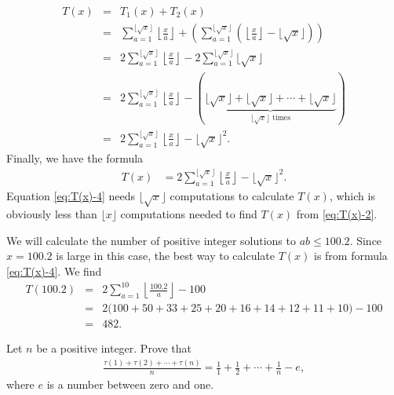 \documentclass[12pt]{subfile}
\begin{document}
	\begin{eqnarray*}
		T(x) &=&  T_1(x) + T_2(x)\\
			 &=& \sum_{a=1}^{\lfloor\sqrt x\rfloor} \left\lfloor\frac{x}{a}\right\rfloor + \left(\sum_{a=1}^{\lfloor\sqrt x\rfloor} \left(\left\lfloor\frac{x}{a}\right\rfloor - \lfloor \sqrt x \rfloor\right)\right)\\
			 &=& 2\sum_{a=1}^{\lfloor\sqrt x\rfloor} \left\lfloor\frac{x}{a}\right\rfloor - 2\sum_{a=1}^{\lfloor\sqrt x\rfloor} \lfloor\sqrt x\rfloor\\
		     &=& 2\sum_{a=1}^{\lfloor\sqrt x\rfloor} \left\lfloor\frac{x}{a}\right\rfloor - \left(\underbrace{\lfloor \sqrt x \rfloor + \lfloor \sqrt x \rfloor + \cdots +‌\lfloor \sqrt x \rfloor}_{\lfloor \sqrt x \rfloor \text{ times}}\right)\\
		     &=& 2\sum_{a=1}^{\lfloor\sqrt x\rfloor} \left\lfloor\frac{x}{a}\right\rfloor - \lfloor \sqrt x \rfloor^2.
	\end{eqnarray*}
Finally, we have the formula
	\begin{align}
		T(x) &= 2\sum_{a=1}^{\lfloor\sqrt x\rfloor} \left\lfloor\frac{x}{a}\right\rfloor - \lfloor \sqrt x \rfloor^2.\label{eq:T(x)-4}
	\end{align}
Equation \ref{eq:T(x)-4} needs $\lfloor \sqrt x \rfloor$ computations to calculate $T(x)$, which is obviously less than $\lfloor x \rfloor$ computations needed to find $T(x)$ from \ref{eq:T(x)-2}.

	\begin{example}
		We will calculate the number of positive integer solutions to $ab \leq 100.2$. Since $x=100.2$ is large in this case, the best way to calculate $T(x)$ is from formula \ref{eq:T(x)-4}. We find
			\begin{eqnarray*}
				T(100.2) &=& 2\sum_{a=1}^{10} \left\lfloor\frac{100.2}{a}\right\rfloor - 100\\
						 &=& 2\big(100 + 50 + 33 + 25 + 20 + 16 + 14 + 12 + 11 + 10\big) - 100\\
						 &=& 482.
			\end{eqnarray*}
	\end{example}

	\begin{theorem}
		Let $n$ be a positive integer. Prove that
			\begin{align*}
				\frac{\tau(1) + \tau(2) + \cdots + \tau(n)}{n} = \frac{1}{1} + \frac{1}{2} + \cdots + \frac{1}{n} - e,
			\end{align*}
		where $e$ is a number between zero and one.
	\end{theorem}
\end{document}
